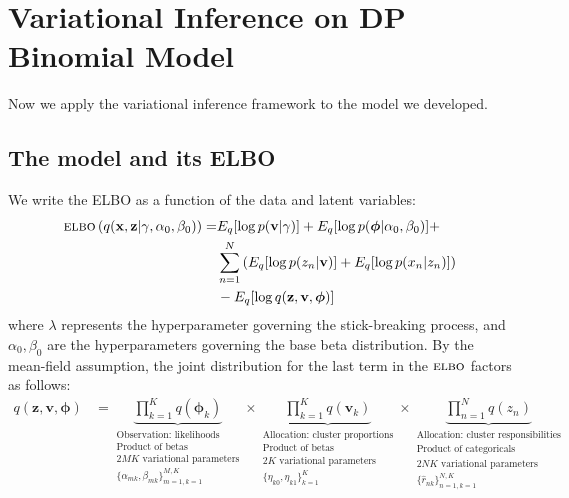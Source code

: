\documentclass[11pt]{article}
\newcommand{\bx}{\ensuremath{\mathbf{x}}}
\newcommand{\bz}{\ensuremath{\mathbf{z}}}
\newcommand{\ELBO}{\textsc{elbo}}
\begin{document}
\newpage
\section{Variational Inference on DP Binomial Model}
Now we apply the variational inference framework to the model we developed.

\subsection{The model and its ELBO}

We write the ELBO as a function of the data and latent variables:
\begin{equation}
	\begin{split}
		\ELBO\left(q(\bx, \bz | \gamma, \alpha_0, \beta_0)\right) = &E_q[\log p(\mathbf{v} | \gamma)] + E_q[ \log p(\bm{\phi} | \alpha_0, \beta_0)] + \\ &\sum\limits_{n=1}^N \left( E_q[\log p(z_n | \mathbf{v})] + E_q[\log p(x_n | z_n)]\right) \\  &- E_q[\log q(\bz, \mathbf{v}, \bm{\phi})]
	\end{split}
\end{equation}
where $\lambda$ represents the hyperparameter governing the stick-breaking process, and $\alpha_0, \beta_0$ are the hyperparameters governing the base beta distribution. By the mean-field assumption, the joint distribution for the last term in the $\ELBO$ factors as follows:
\begin{align}
    q(\bz, \mathbf{v}, \bm{\phi}) &=
\underbrace{\prod\limits_{k=1}^K q(\bm{\phi}_k)}_{\substack{\text{Observation: likelihoods}  \\  \text{Product of betas} \\ 2MK \text{ variational parameters} \\  \{\alpha_{mk}, \beta_{mk} \}_{m=1, k=1}^{M, K} }} \times
 \underbrace{\prod\limits_{k=1}^K q(\mathbf{v}_k)}_{\substack{\text{Allocation: cluster proportions} \\ \text{Product of betas} \\ 2K \text{ variational parameters}  \\ \{\eta_{k0}, \eta_{k1}\}_{k=1}^K   }} \times
 \underbrace{\prod\limits_{n=1}^{N} q(z_n)}_{\substack{ \text{Allocation: cluster responsibilities} \\ \text{Product of categoricals} \\ 2NK \text{ variational parameters}  \\ \{\hat{r}_{nk}\}_{n=1, k=1}^{N, K}   }} \nonumber
\end{align}
\end{document}
